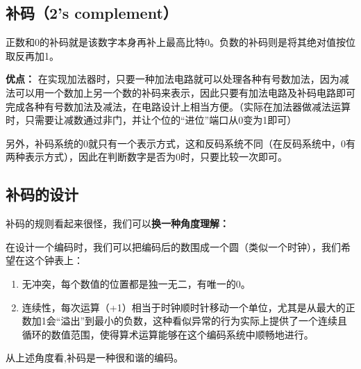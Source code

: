 \subsection{补码（2's complement）}

正数和0的补码就是该数字本身再补上最高比特0。负数的补码则是将其绝对值按位取反再加1。


\textbf{优点：}
在实现加法器时，只要一种加法电路就可以处理各种有号数加法，因为减法可以用一个数加上另一个数的补码来表示，因此只要有加法电路及补码电路即可完成各种有号数加法及减法，在电路设计上相当方便。（实际在加法器做减法运算时，只需要让减数通过非门，并让个位的“进位”端口从0变为1即可）

另外，补码系统的0就只有一个表示方式，这和反码系统不同（在反码系统中，0有两种表示方式），因此在判断数字是否为0时，只要比较一次即可。


\subsection{补码的设计}

补码的规则看起来很怪，我们可以\textbf{换一种角度理解：}

在设计一个编码时，我们可以把编码后的数围成一个圆（类似一个时钟），我们希望在这个钟表上：
\begin{enumerate}
\item 
无冲突，每个数值的位置都是独一无二，有唯一的0。
\item 
连续性，每次运算（+1）相当于时钟顺时针移动一个单位，尤其是从最大的正数加1会“溢出”到最小的负数，这种看似异常的行为实际上提供了一个连续且循环的数值范围，使得算术运算能够在这个编码系统中顺畅地进行。
\end{enumerate}

从上述角度看,补码是一种很和谐的编码。








